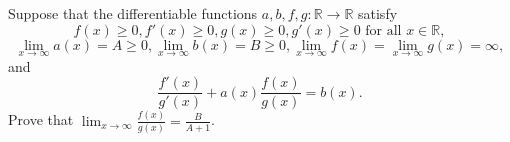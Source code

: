 Suppose that the differentiable functions \(a, b, f, g\colon \mathbb{R} \to \mathbb{R} \) satisfy
\[ f(x)\geq 0, f'(x) \geq 0,g(x)\geq 0, g'(x) \geq 0 \text{ for all } x \in \mathbb{R}, \]\[\lim_{x\rightarrow \infty} a(x)=A\geq 0,\lim_{x\rightarrow \infty} b(x)=B\geq 0, \lim_{x\rightarrow \infty} f(x)=\lim_{x\rightarrow \infty} g(x)=\infty,\]and
\[\frac{f'(x)}{g'(x)}+a(x)\frac{f(x)}{g(x)}=b(x).\]Prove that \(\lim_{x\rightarrow\infty}\frac{f(x)}{g(x)}=\frac{B}{A+1}\).